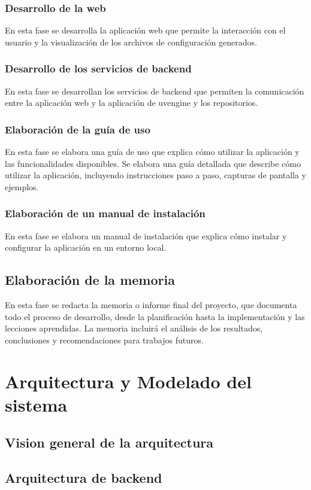 \documentclass[12pt, a4paper, twoside]{article}
\begin{document}
\subsubsection{Desarrollo de la web}
En esta fase se desarrolla la aplicación web que permite la interacción con el usuario y la visualización de los archivos de configuración generados.
\subsubsection{Desarrollo de los servicios de backend}
En esta fase se desarrollan los servicios de backend que permiten la comunicación entre la aplicación web y la aplicación de uvengine y los repositorios.
\subsubsection{Elaboración de la guía de uso}
En esta fase se elabora una guía de uso que explica cómo utilizar la aplicación y las funcionalidades disponibles.
Se elabora una guía detallada que describe cómo utilizar la aplicación, incluyendo instrucciones paso a paso, capturas 
de pantalla y ejemplos. 
\subsubsection{Elaboración de un manual de instalación}
En esta fase se elabora un manual de instalación que explica cómo instalar y configurar la aplicación en un entorno local.
\subsection{Elaboración de la memoria}
En esta fase se redacta la memoria o informe final del proyecto, que documenta todo el proceso de desarrollo, desde la 
planificación hasta la implementación y las lecciones aprendidas. La memoria incluirá el análisis de los resultados, 
conclusiones y recomendaciones para trabajos futuros. 



\section{Arquitectura y Modelado del sistema }
\subsection{Vision general de la arquitectura }
\subsection{Arquitectura de backend}
\end{document}
